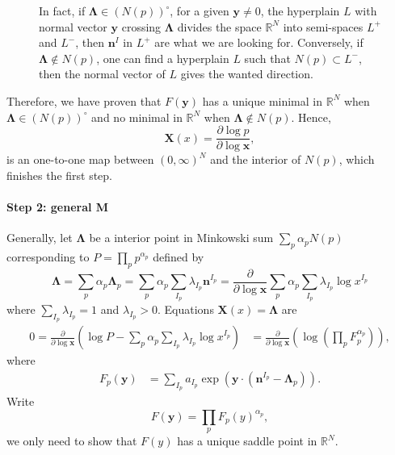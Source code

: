 \documentclass[12pt]{article}
\theoremstyle{definition}
\theoremstyle{plain}
\begin{document}
\begin{figure}[htbp]
\centering
{}

\caption{}
In fact, if $\mathbf\Lambda \in (N(p))^\circ$, for a given $\mathbf y\neq 0$, the hyperplain $L$ with normal vector $\mathbf y$ crossing $\mathbf \Lambda$ divides the space $\mathbb R^N$ into semi-spaces $L^+$ and $L^-$, then $\mathbf{n}^I$ in $L^+$ are what we are looking for. Conversely, if $\mathbf\Lambda \not\in N(p)$, one can find a hyperplain $L$ such that $N(p)\subset L^-$, then the normal vector of $L$ gives the wanted direction. 

\end{figure}






Therefore, we have proven that $F(\mathbf y)$ has a unique minimal in $\mathbb R^N$ when $\mathbf \Lambda \in (N(p))^\circ$ and no minimal in $\mathbb R^N$ when $\mathbf \Lambda \not\in N(p)$. Hence, 
\[
	\mathbf X(x)=\frac{\partial \log p}{\partial \log \mathbf x},
\]
is an one-to-one map between $(0,\infty)^N$ and the interior of $N(p)$, which finishes the first step.



\paragraph{Step 2: general M}
Generally, let $\mathbf{\Lambda}$ be a interior point in Minkowski sum $\sum_p \alpha_p N(p)$ corresponding to $P=\prod_p p^{\alpha_p}$ defined by 
\[
	\mathbf{\Lambda}
	=\sum_p \alpha_p \mathbf{\Lambda}_p
	=\sum_p \alpha_p \sum_{I_p}\lambda_{I_p}\mathbf{n}^{I_p}
	=\frac{\partial}{\partial \log \mathbf{x}}\sum_{p}\alpha_p\sum_{I_p}\lambda_{I_p} \log x^{I_p}
\]
where $\sum_{I_p} \lambda_{I_p}=1$ and $\lambda_{I_p} > 0$. Equations $\mathbf{X}(x)=\mathbf{\Lambda}$ are 
\[
\begin{aligned}
	0=\frac{\partial }{\partial \log \mathbf{x}}\left(
	\log P-\sum_{p}\alpha_p\sum_{I_p}\lambda_{I_p} \log x^{I_p}
	\right)&=\frac{\partial }{\partial \log \mathbf{x}}\left(
	\log \left(\prod_p F_p^{\alpha_p}\right)
	\right),
\end{aligned}
\]
where
\[
	\begin{aligned}
		F_p(\mathbf y)&=\sum_{I_p} a_{I_p} \exp\left(\mathbf{y}\cdot \left(\mathbf{n}^{I_p}-\mathbf{\Lambda}_p\right)\right).
	\end{aligned}
\]
Write
\[
	F(\mathbf y)=\prod_p F_p(y)^{\alpha_p},
\]
we only need to show that $F(y)$ has a unique saddle point in $\mathbb R^N$.
\end{document}
